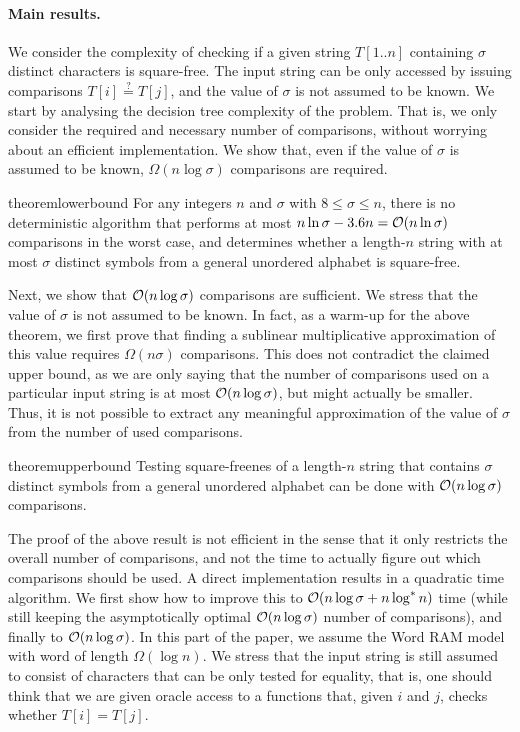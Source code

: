 \paragraph{Main results.}

We consider the complexity of checking if a given string $T[1..n]$ containing $\sigma$ distinct characters is square-free. 
The input string can be only accessed by issuing comparisons $T[i]\stackrel{?}{=} T[j]$, and the value of $\sigma$ is not
assumed to be known. We start by analysing the decision tree complexity of the problem. That is, we only
consider the required and necessary number of comparisons, without worrying about an efficient implementation.
We show that, even if the value of $\sigma$ is assumed to be known, $\Omega(n\log \sigma)$ comparisons are required. 

\begin{restatable}{theorem}{lowerbound}
\label{thm:lowerbound}
For any integers $n$ and $\sigma$ with $8 \leq \sigma \leq n$, there is no deterministic algorithm that performs at most $n \ln \sigma - 3.6n = \mathcal{O}(n \ln \sigma)$ comparisons in the worst case, and determines whether a length-$n$ string with at most $\sigma$ distinct symbols from a general unordered alphabet is square-free.
\end{restatable}

Next, we show that $\mathcal{O}(n\log \sigma)$ comparisons are sufficient. We stress that the value of $\sigma$ is not assumed to
be known. In fact, as a warm-up for the above theorem, we first prove that finding a sublinear multiplicative approximation
of this value requires $\Omega(n\sigma)$ comparisons. This does not contradict the claimed upper bound, as we are only saying
that the number of comparisons used on a particular input string is at most $\mathcal{O}(n\log \sigma)$, but might actually be smaller.
Thus, it is not possible to extract any meaningful approximation of the value of $\sigma$ from the number of used comparisons.

\begin{restatable}{theorem}{upperbound}
\label{thm:upperbound}
Testing square-freenes of a length-$n$ string that contains $\sigma$ distinct symbols from a general unordered alphabet can be done with $\mathcal{O}(n \log \sigma)$ comparisons.
\end{restatable}

The proof of the above result is not efficient in the sense that it only restricts the overall number of comparisons, and not the time
to actually figure out which comparisons should be used.  A direct implementation results in a quadratic time algorithm. We first
show how to improve this to $\mathcal{O}(n\log \sigma+n\log^{*}n)$ time (while still keeping the asymptotically optimal $\mathcal{O}(n\log \sigma)$ number
of comparisons), and finally to $\mathcal{O}(n\log \sigma)$. In this part of the paper, we assume the Word RAM model with word of length $\Omega(\log n)$.
We stress that the input string is still assumed to consist of characters that can be only tested for equality, that is, one should
think that we are given oracle access to a functions that, given $i$ and $j$, checks whether $T[i]=T[j]$.

